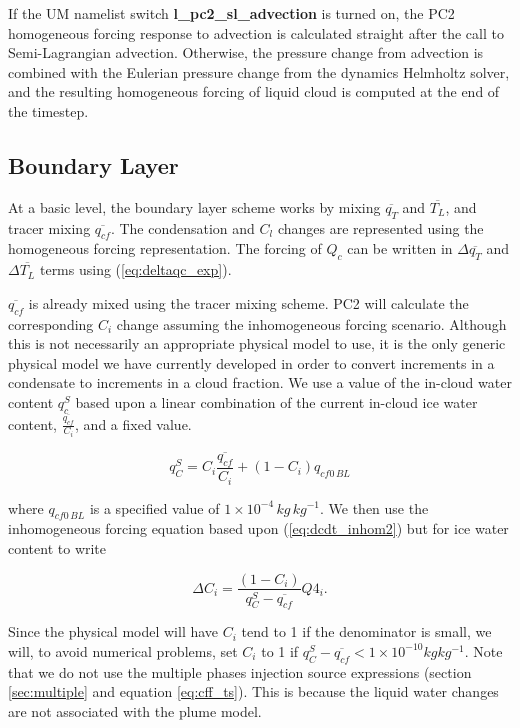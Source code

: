 \documentclass{UMDP_article}
\begin{document}
If the UM namelist switch \textbf{l\_pc2\_sl\_advection} is turned on,
the PC2 homogeneous forcing response to advection is calculated
straight after the call to Semi-Lagrangian advection.
Otherwise, the pressure change from advection is combined with the
Eulerian pressure change from the dynamics Helmholtz solver, and the resulting
homogeneous forcing of liquid cloud is computed at the end of the timestep.

\subsection{Boundary Layer}
\label{sec:bl}
At a basic level, the boundary layer scheme works by
mixing $\overline{q_T}$ and $\overline{T_L}$, and tracer mixing
$\overline{q_{cf}}$. The condensation and $C_l$ changes are represented
using the homogeneous forcing representation. The forcing of $Q_c$ can be
written in $\Delta \overline{q_T}$ and $\Delta \overline{T_L}$ terms
using (\ref{eq:deltaqc_exp}).

$\overline{q_{cf}}$ is already mixed using the tracer mixing scheme. PC2
will calculate the corresponding $C_i$ change assuming the inhomogeneous
forcing scenario. Although this is not necessarily an appropriate physical
model to use, it is the only generic physical model we have currently
developed in order to convert increments in a condensate to increments in
a cloud fraction. We use a value of the in-cloud water content $q_c^S$
based upon a linear combination of the current in-cloud ice water
content, $\frac{\overline{q_{cf}}}{C_i}$, and a fixed value.

\begin{equation}
q_C^S = C_i \frac{\overline{q_{cf}}}{C_i} + ( 1 - C_i) q_{cf0 \, BL}
\label{eq:qcf_ci}
\end{equation}

where $q_{cf0 \, BL}$ is a specified value of $1 \times 10^{-4} \, kg \, kg^{-1}$.
We then use the inhomogeneous forcing equation based upon
(\ref{eq:dcdt_inhom2}) but for ice water content to write

\begin{equation}
\Delta C_i = \frac{(1 - C_i)}{q_C^S - \overline{q_{cf}}} Q4_i .
\label{eq:deltaci_bl}
\end{equation}

Since the physical model will have $C_i$ tend to 1 if the
denominator is small, we will, to avoid numerical problems, set
$C_i$ to 1 if $q_C^S - \overline{q_{cf}} < 1 \times 10^{-10} kg kg^{-1}$.
Note that we do not use the multiple phases injection source
expressions (section \ref{sec:multiple} and equation \ref{eq:cff_ts}).
This is because the liquid water changes are not associated with the plume model.
\end{document}
